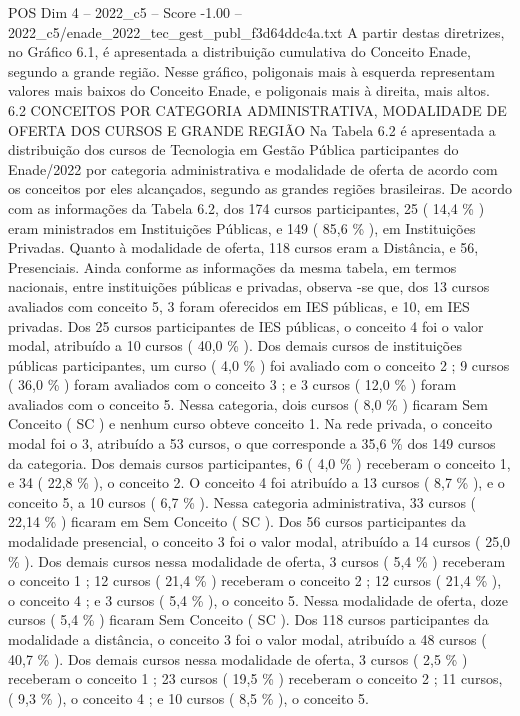 \begin{textsample}{POS Dim 4 – 2022\_c5 – Score -1.00 – 2022\_c5/enade\_2022\_tec\_gest\_publ\_f3d64ddc4a.txt}
A partir destas diretrizes, no Gráfico 6.1, é apresentada a distribuição cumulativa do Conceito Enade, segundo a grande região.
Nesse gráfico, poligonais mais à esquerda representam valores mais baixos do Conceito Enade, e poligonais mais à direita, mais altos. 6.2 CONCEITOS POR CATEGORIA ADMINISTRATIVA, MODALIDADE DE OFERTA DOS CURSOS E GRANDE REGIÃO Na Tabela 6.2 é apresentada a distribuição dos cursos de Tecnologia em Gestão Pública participantes do Enade/2022 por categoria administrativa e modalidade de oferta de acordo com os conceitos por eles alcançados, segundo as grandes regiões brasileiras.
De acordo com as informações da Tabela 6.2, dos 174 cursos participantes, 25 ( 14,4 \% ) eram ministrados em Instituições Públicas, e 149 ( 85,6 \% ), em Instituições Privadas.
Quanto à modalidade de oferta, 118 cursos eram a Distância, e 56, Presenciais.
Ainda conforme as informações da mesma tabela, em termos nacionais, entre instituições públicas e privadas, observa -se que, dos 13 cursos avaliados com conceito 5, 3 foram oferecidos em IES públicas, e 10, em IES privadas.
Dos 25 cursos participantes de IES públicas, o conceito 4 foi o valor modal, atribuído a 10 cursos ( 40,0 \% ).
Dos demais cursos de instituições públicas participantes, um curso ( 4,0 \% ) foi avaliado com o conceito 2 ; 9 cursos ( 36,0 \% ) foram avaliados com o conceito 3 ; e 3 cursos ( 12,0 \% ) foram avaliados com o conceito 5.
Nessa categoria, dois cursos ( 8,0 \% ) ficaram Sem Conceito ( SC ) e nenhum curso obteve conceito 1.
Na rede privada, o conceito modal foi o 3, atribuído a 53 cursos, o que corresponde a 35,6 \% dos 149 cursos da categoria.
Dos demais cursos participantes, 6 ( 4,0 \% ) receberam o conceito 1, e 34 ( 22,8 \% ), o conceito 2.
O conceito 4 foi atribuído a 13 cursos ( 8,7 \% ), e o conceito 5, a 10 cursos ( 6,7 \% ).
Nessa categoria administrativa, 33 cursos ( 22,14 \% ) ficaram em Sem Conceito ( SC ).
Dos 56 cursos participantes da modalidade presencial, o conceito 3 foi o valor modal, atribuído a 14 cursos ( 25,0 \% ).
Dos demais cursos nessa modalidade de oferta, 3 cursos ( 5,4 \% ) receberam o conceito 1 ; 12 cursos ( 21,4 \% ) receberam o conceito 2 ; 12 cursos ( 21,4 \% ), o conceito 4 ; e 3 cursos ( 5,4 \% ), o conceito 5.
Nessa modalidade de oferta, doze cursos ( 5,4 \% ) ficaram Sem Conceito ( SC ).
Dos 118 cursos participantes da modalidade a distância, o conceito 3 foi o valor modal, atribuído a 48 cursos ( 40,7 \% ).
Dos demais cursos nessa modalidade de oferta, 3 cursos ( 2,5 \% ) receberam o conceito 1 ; 23 cursos ( 19,5 \% ) receberam o conceito 2 ; 11 cursos, ( 9,3 \% ), o conceito 4 ; e 10 cursos ( 8,5 \% ), o conceito 5.

\end{textsample}
